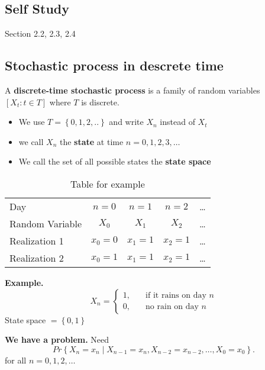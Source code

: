 \documentclass{article}
\theoremstyle{remark}
\begin{document}
\subsection{Self Study}%
\label{sub:self_study}

Section 2.2, 2.3, 2.4

\subsection{Stochastic process in descrete time}%
\label{sub:stochastic_process_in_descrete_time}
\begin{definition}
  A \textbf{discrete-time stochastic process}  is a family of random variables $\left[ X_{t} : t \in  T \right]$ where $T$ is discrete.
  \begin{itemize}
    \item We use $T = \left\{ 0,1,2,.. \right\}$ and write $X_{n}$ instead of $X_{t}$
    \item  we call $X_{n}$ the \textbf{state}  at time $n =  0,1,2,3, \ldots$
    \item We call the set of all possible states the \textbf{state space} 
  \end{itemize}
\end{definition}

\begin{table}[htpb]
  \centering
  \caption{Table for example}
  \label{tab:label}
  \begin{tabular}{l|cccc}
    Day & $n =0$ & $n=1$ & $n=2$ & \ldots \\ 
    Random Variable  & $X_{0} $ & $X_{1}$ & $X_{2}$ & \ldots \\
    Realization  1& $x_{0} = 0$ & $x_{1} =1$ &  $x_{2} = 1 $ & \ldots \\
    Realization 2 & $x_{0} = 1$ & $x_{1} =1$ &  $x_{2} = 1 $ & \ldots \\
  \end{tabular}
\end{table}
\begin{tcolorbox}
  \textbf{Example.}  \[
  X_{n} = \begin{cases}
    1 ,  &  \quad \text{if it rains on day } n \\
    0,   &  \quad     \text{no rain on day } n
  \end{cases}
  \] 
  State space $= \left\{ 0,1 \right\}$
  \par
  \textbf{We have a problem.} Need \[
  Pr \left \{ X_{n} = x_{n}  \mid  X_{n-1} = x_{n} , X_{n-2} = x_{n-2}, \ldots, X_{0} = x_{0} \right \}.
  \]    for all $n = 0,1,2,\ldots$

\end{tcolorbox}
\end{document}
